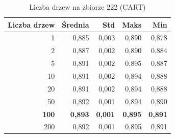 \begin{table}[htbp]
\centering
\small
\setlength{\tabcolsep}{6pt}
\renewcommand{\arraystretch}{1.2}
\caption{Liczba drzew na zbiorze 222 (CART)}
\label{tab:CART_tree_count_222}
\begin{tabular}{r|r|r|r|r}
\toprule
Liczba drzew & Średnia & Std & Maks & Min \\
\hline
1 & 0,885 & 0,003 & 0,890 & 0,878 \\
2 & 0,887 & 0,002 & 0,890 & 0,884 \\
5 & 0,891 & 0,002 & 0,895 & 0,887 \\
10 & 0,891 & 0,002 & 0,894 & 0,888 \\
20 & 0,891 & 0,002 & 0,894 & 0,888 \\
50 & 0,892 & 0,001 & 0,894 & 0,890 \\
\textbf{100} & \textbf{0,893} & \textbf{0,001} & \textbf{0,895} & \textbf{0,891} \\
200 & 0,892 & 0,001 & 0,895 & 0,891 \\
\bottomrule
\end{tabular}
\end{table}